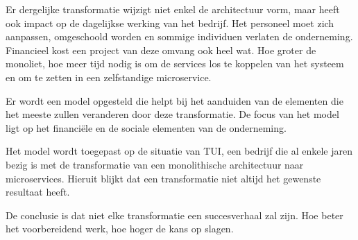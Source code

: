 Er dergelijke transformatie wijzigt niet enkel de architectuur vorm, maar heeft ook impact op de dagelijkse werking van het bedrijf. Het personeel moet zich aanpassen, omgeschoold worden en sommige individuen verlaten de onderneming. Financieel kost een project van deze omvang ook heel wat. Hoe groter de monoliet, hoe meer tijd nodig is om de services los te koppelen van het systeem en om te zetten in een zelfstandige microservice. 

Er wordt een model opgesteld die helpt bij het aanduiden van de elementen die het meeste zullen veranderen door deze transformatie. De focus van het model ligt op het financiële en de sociale elementen van de onderneming.

Het model wordt toegepast op de situatie van TUI, een bedrijf die al enkele jaren bezig is met de transformatie van een monolithische architectuur naar microservices. Hieruit blijkt dat een transformatie niet altijd het gewenste resultaat heeft. 

De conclusie is dat niet elke transformatie een succesverhaal zal zijn. Hoe beter het voorbereidend werk, hoe hoger de kans op slagen.

